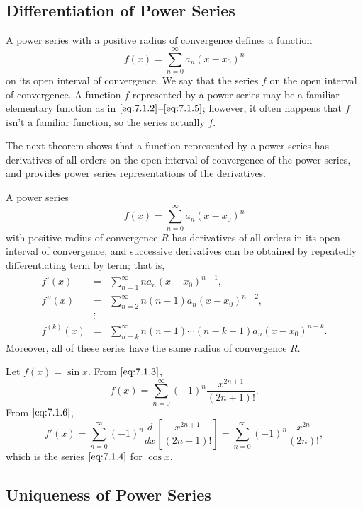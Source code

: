 \documentclass{ximera}
\begin{document}
\subsection*{Differentiation of Power Series}

A power series with a positive radius of convergence defines a
function
$$
f(x)=\sum_{n=0}^\infty a_n(x-x_0)^n
$$
on its open interval of convergence. We say that the series  $f$ on the open interval of convergence. A function $f$
represented by a power series may be a familiar elementary function
as in $\eqref{eq:7.1.2}$--$\eqref{eq:7.1.5}$;     however, it often happens
that
$f$ isn't  a familiar function,  so  the series actually   $f$.

The next  theorem shows  that a  function represented  by a power
series  has  derivatives  of  all  orders  on  the  open  interval  of
convergence  of   the  power   series,  and   provides  power  series
representations of the derivatives.

\begin{theorem}\label{thmtype:7.1.4}
A power series
$$
f(x)=\sum_{n=0}^\infty a_n(x-x_0)^n
$$
with positive radius of convergence $R$ has derivatives of all orders
in its open interval of convergence, and successive  derivatives
can be obtained by repeatedly differentiating term by term; that is,
\begin{eqnarray}
f'(x)&=&\sum_{n=1}^\infty
na_n(x-x_0)^{n-1}\label{eq:7.1.6},\\
f''(x)&=&\sum_{n=2}^\infty
n(n-1)a_n(x-x_0)^{n-2},\label{eq:7.1.7}\\
&\vdots&\nonumber\\
f^{(k)}(x)&=&\sum_{n=k}^\infty
n(n-1)\cdots(n-k+1)a_n(x-x_0)^{n-k}\label{eq:7.1.8}.
\end{eqnarray}
Moreover, all of these series have the same radius of convergence $R$.
\end{theorem}

\begin{example}\label{example:7.1.2}
Let $f(x)=\sin x$. From $\eqref{eq:7.1.3}$,
$$
f(x)=\sum_{n=0}^\infty(-1)^n \frac{x^{2n+1}}{(2n+1)!}.
$$
From $\eqref{eq:7.1.6}$,
$$
f'(x)=\sum_{n=0}^\infty(-1)^n\frac{d}{dx}\left[\frac{x^{2n+1}}{(2n+1)!}\right]=
\sum_{n=0}^\infty(-1)^n \frac{x^{2n}}{(2n)!},
$$
which is the series  $\eqref{eq:7.1.4}$ for $\cos x$.
\end{example}

\subsection*{Uniqueness of Power Series}
\end{document}
